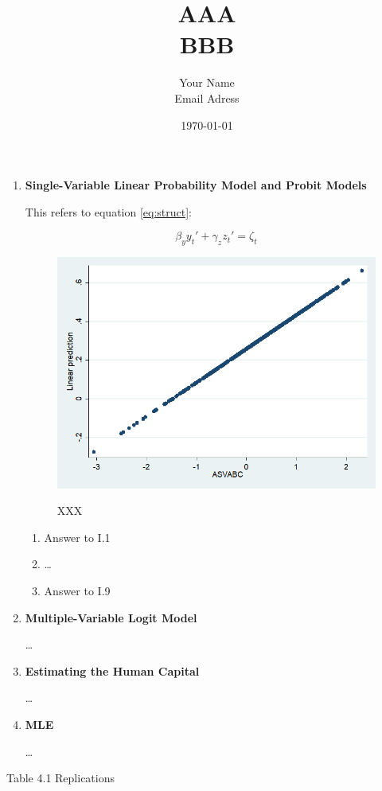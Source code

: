 \documentclass{article}
\title{AAA \\
    \normalsize BBB}
\date{\today}
\author{Your Name \\
        Email Adress}
\begin{document}
\maketitle

\begin{enumerate}[I]

\item \textbf{Single-Variable Linear Probability Model and Probit Models}

This refers to equation \ref{eq:struct}:

\begin{equation}\label{eq:struct}
    \beta_y y_t' + \gamma_z z_t' = \zeta_t
\end{equation}

%

\begin{figure}
    \centering
    \includegraphics[scale = 0.15]{graphs/linear.png}
    \label{XXX}\caption{XXX}
\end{figure}
\FloatBarrier

\begin{enumerate}[1.]
    \item Answer to I.1
    
    \item \dots
    
    \item Answer to I.9
\end{enumerate}

\item\textbf{Multiple-Variable Logit Model}

\dots

\item\textbf{Estimating the Human Capital}

\dots

\item\textbf{MLE}

\dots

\end{enumerate}

Table 4.1 Replications 

\end{document}
